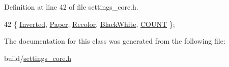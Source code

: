 Definition at line 42 of file settings\+\_\+core.\+h.


\begin{DoxyCode}
42 \{ \hyperlink{classOkular_1_1SettingsCore_1_1EnumRenderMode_aae172bdb345dda4d639e763709ea357aae3a52d8c06b668f28a3f3d646c49d3b0}{Inverted}, \hyperlink{classOkular_1_1SettingsCore_1_1EnumRenderMode_aae172bdb345dda4d639e763709ea357aa58af23c7fbd8ea1998995a8eaffa125d}{Paper}, \hyperlink{classOkular_1_1SettingsCore_1_1EnumRenderMode_aae172bdb345dda4d639e763709ea357aa4ed9520dc788e5254440ebd166aedbd8}{Recolor}, \hyperlink{classOkular_1_1SettingsCore_1_1EnumRenderMode_aae172bdb345dda4d639e763709ea357aacfc5ee223333e478da6fb379a9eaa23a}{BlackWhite}, \hyperlink{classOkular_1_1SettingsCore_1_1EnumRenderMode_aae172bdb345dda4d639e763709ea357aae8b9a005a7b38b65d267ba7b2827e33e}{COUNT} \};
\end{DoxyCode}


The documentation for this class was generated from the following file\+:\begin{DoxyCompactItemize}
\item 
build/\hyperlink{settings__core_8h}{settings\+\_\+core.\+h}\end{DoxyCompactItemize}
